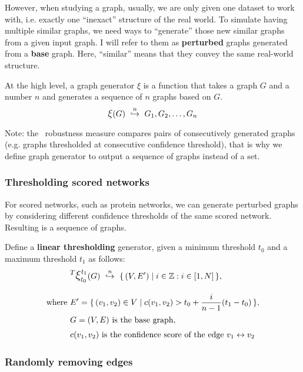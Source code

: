 However, when studying a graph, usually, we are only given one dataset to work with, i.e. exactly one ``inexact'' structure of the real world.
To simulate having multiple similar graphs, we need ways to ``generate'' those new similar graphs from a given input graph.
I will refer to them as \textbf{perturbed} graphs generated from a \textbf{base} graph.
Here, ``similar'' means that they convey the same real-world structure.

At the high level, a graph generator $\xi$ is a function that takes a graph $G$ and a number $n$ and generates a sequence of $n$ graphs based on $G$.
\begin{equation}
    \mathlarger{\xi}(G) \generates{n} G_1, G_2, \dots, G_n
\end{equation}

Note: the~ robustness measure compares pairs of consecutively generated graphs (e.g. graphs thresholded at consecutive confidence threshold), that is why we define graph generator to output a sequence of graphs instead of a set.

\subsubsection{Thresholding scored networks}

For scored networks, such as protein networks, we can generate perturbed graphs by considering different confidence thresholds of the same scored network.
Resulting is a sequence of graphs.

Define a \textbf{linear thresholding} generator, given a minimum threshold $t_0$ and a maximum threshold $t_1$ as follows:
\begin{align}
    &\mathlarger{^T \mathlarger{\xi}}_{t_0}^{t_1}(G) \ \overset{n}{\hookrightarrow}\  \Set{ (V, E') }{i\in\Bbb Z:i\in[1,N] }, \\[10pt]
    \text{where}~&E' = \Set{(v_1, v_2)\in V}{ c(v_1, v_2) > t_0 + \frac{i}{n - 1}(t_1 - t_0) }, \nonumber \\
    &G = (V, E)~\text{is the base graph}, \nonumber \\
    &c(v_1, v_2)~\text{is the confidence score of the edge $v_1 \leftrightarrow v_2$} \nonumber
\end{align}



\subsubsection{Randomly removing edges}\label{sub:randomly_removing_edges}




